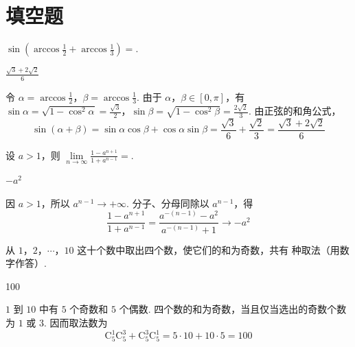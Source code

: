 \section{填空题}

\begin{problem}
\(\sin\left(\arccos \frac{1}{2}+\arccos \frac{1}{3}\right)=\)\fillinblank{}.
\end{problem}

\begin{answer}
\(\frac{\sqrt{3}+2\sqrt{2}}{6}\)
\end{answer}

\begin{solution}
令 \(\alpha=\arccos\frac12\)，\(\beta=\arccos\frac13\). 由于 \(\alpha\)，\(\beta\in[0,\pi]\)，有
\(\sin\alpha=\sqrt{1-\cos^2\alpha}=\frac{\sqrt3}{2}\)，\(\sin\beta=\sqrt{1-\cos^2\beta}=\frac{2\sqrt2}{3}\).
由正弦的和角公式，
\[
\sin(\alpha+\beta)=\sin\alpha\cos\beta+\cos\alpha\sin\beta
=\frac{\sqrt3}{6}+\frac{\sqrt2}{3}
=\frac{\sqrt3+2\sqrt2}{6}
\]
\end{solution}

\begin{problem}
设 \(a>1\)，则 \(\displaystyle\lim\limits_{n\to\infty}\frac{1-a^{n+1}}{1+a^{n-1}}=\)\fillinblank{}.
\end{problem}

\begin{answer}
\(-a^2\)
\end{answer}

\begin{solution}
因 \(a>1\)，所以 \(a^{n-1}\to+\infty\). 分子、分母同除以 \(a^{n-1}\)，得
\[
\frac{1-a^{n+1}}{1+a^{n-1}}
=\frac{a^{-(n-1)}-a^2}{a^{-(n-1)}+1}
\longrightarrow -a^2
\]
\end{solution}

\begin{problem}
从 \(1\)，\(2\)，\(\cdots\)，\(10\) 这十个数中取出四个数，使它们的和为奇数，共有\fillinblank{} 种取法（用数字作答）.
\end{problem}

\begin{answer}
100
\end{answer}

\begin{solution}
\(1\) 到 \(10\) 中有 \(5\) 个奇数和 \(5\) 个偶数. 四个数的和为奇数，当且仅当选出的奇数个数为 \(1\) 或 \(3\). 因而取法数为
\[
\mathrm C_5^1\mathrm C_5^3+\mathrm C_5^3\mathrm C_5^1=5\cdot10+10\cdot5=100
\]
\end{solution}

